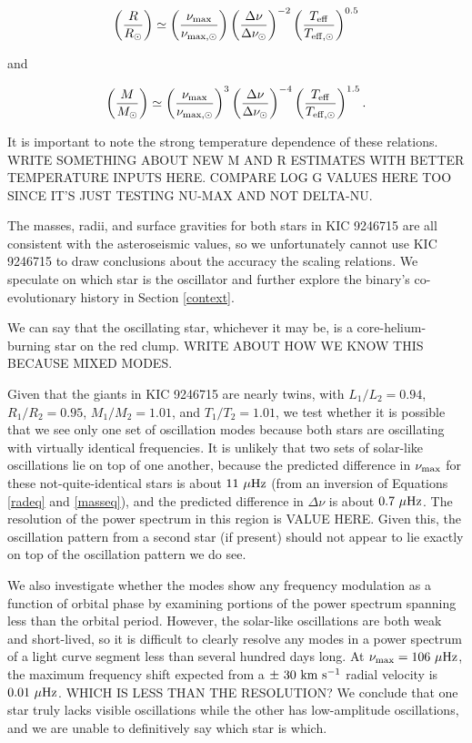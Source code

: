 \begin{equation} %
\left( \frac{R}{R_\odot} \right) \simeq \left( \frac{\nu_{\rm{max}}}{\nu_{\rm{max,\odot}}} \right) \left( \frac{\Delta \nu}{\Delta \nu_\odot} \right)^{-2} \left( \frac{T_{\rm{eff}}}{T_{\rm{eff,\odot}}} \right)^{0.5}
\end{equation}

and

\begin{equation} %
\left( \frac{M}{M_\odot} \right) \simeq {\left( \frac{\nu_{\rm{max}}}{\nu_{\rm{max,\odot}}} \right)}^{3} \left( \frac{\Delta \nu}{\Delta \nu_\odot} \right)^{-4} \left( \frac {T_{\rm{eff}}} {T_{\rm{eff,\odot}}} \right)^{1.5}.
\end{equation}

It is important to note the strong temperature dependence of these relations. WRITE SOMETHING ABOUT NEW M AND R ESTIMATES WITH BETTER TEMPERATURE INPUTS HERE. COMPARE LOG G VALUES HERE TOO SINCE IT'S JUST TESTING NU-MAX AND NOT DELTA-NU.

The masses, radii, and surface gravities for both stars in KIC 9246715 are all consistent with the asteroseismic values, so we unfortunately cannot use KIC 9246715 to draw conclusions about the accuracy the scaling relations. We speculate on which star is the oscillator and further explore the binary's co-evolutionary history in Section \ref{context}.

We can say that the oscillating star, whichever it may be, is a core-helium-burning star on the red clump. WRITE ABOUT HOW WE KNOW THIS BECAUSE MIXED MODES. 

Given that the giants in KIC 9246715 are nearly twins, with $L_1/L_2 = 0.94$, $R_1/R_2 = 0.95$, $M_1/M_2 = 1.01$, and $T_1/T_2 = 1.01$, we test whether it is possible that we see only one set of oscillation modes because both stars are oscillating with virtually identical frequencies. It is unlikely that two sets of solar-like oscillations lie on top of one another, because the predicted difference in $\nu_{\rm{max}}$ for these not-quite-identical stars is about $11 \ \mu \rm{Hz}$ (from an inversion of Equations \ref{radeq} and \ref{masseq}), and the predicted difference in $\Delta \nu$ is about $0.7 \ \mu \rm{Hz}$. The resolution of the power spectrum in this region is VALUE HERE. Given this, the oscillation pattern from a second star (if present) should not appear to lie exactly on top of the oscillation pattern we do see.

We also investigate whether the modes show any frequency modulation as a function of orbital phase by examining portions of the power spectrum spanning less than the orbital period. However, the solar-like oscillations are both weak and short-lived, so it is difficult to clearly resolve any modes in a power spectrum of a light curve segment less than several hundred days long. At $\nu_{\rm{max}} = 106 \ \mu \rm{Hz}$, the maximum frequency shift expected from a $\pm \ 30 \ \rm{km} \ \rm{s}^{-1}$ radial velocity is $0.01 \ \mu \rm{Hz}$. WHICH IS LESS THAN THE RESOLUTION? We conclude that one star truly lacks visible oscillations while the other has low-amplitude oscillations, and we are unable to definitively say which star is which.
